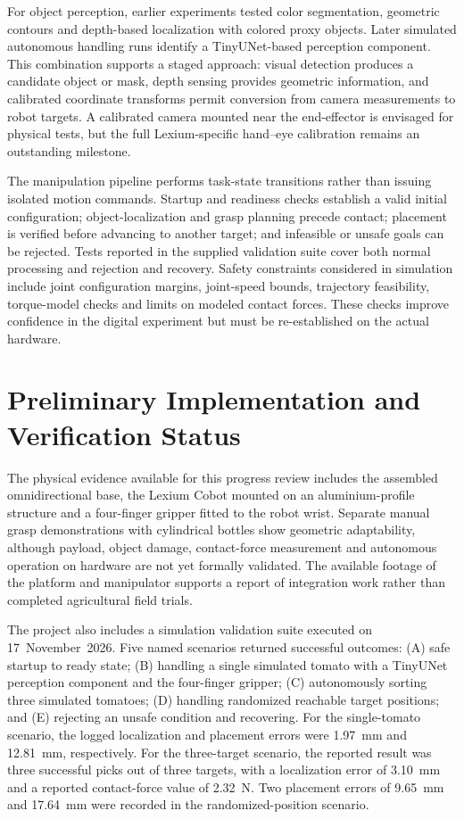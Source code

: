 For object perception, earlier experiments tested color segmentation, geometric
contours and depth-based localization with colored proxy objects. Later simulated
autonomous handling runs identify a TinyUNet-based perception component. This
combination supports a staged approach: visual detection produces a candidate object
or mask, depth sensing provides geometric information, and calibrated coordinate
transforms permit conversion from camera measurements to robot targets. A calibrated
camera mounted near the end-effector is envisaged for physical tests, but the full
Lexium-specific hand--eye calibration remains an outstanding milestone.

The manipulation pipeline performs task-state transitions rather than issuing isolated
motion commands. Startup and readiness checks establish a valid initial configuration;
object-localization and grasp planning precede contact; placement is verified before
advancing to another target; and infeasible or unsafe goals can be rejected. Tests
reported in the supplied validation suite cover both normal processing and rejection
and recovery. Safety constraints considered in simulation include joint configuration
margins, joint-speed bounds, trajectory feasibility, torque-model checks and limits on
modeled contact forces. These checks improve confidence in the digital experiment but
must be re-established on the actual hardware.

\section{Preliminary Implementation and Verification Status}
\label{sec:progress}

The physical evidence available for this progress review includes the assembled
omnidirectional base, the Lexium Cobot mounted on an aluminium-profile structure and
a four-finger gripper fitted to the robot wrist. Separate manual grasp demonstrations
with cylindrical bottles show geometric adaptability, although payload, object damage,
contact-force measurement and autonomous operation on hardware are not yet formally
validated. The available footage of the platform and manipulator supports a report
of integration work rather than completed agricultural field trials.

The project also includes a simulation validation suite executed on 17~November~2026.
Five named scenarios returned successful outcomes: (A) safe startup to ready state;
(B) handling a single simulated tomato with a TinyUNet perception component and the
four-finger gripper; (C) autonomously sorting three simulated tomatoes; (D) handling
randomized reachable target positions; and (E) rejecting an unsafe condition and
recovering. For the single-tomato scenario, the logged localization and placement
errors were 1.97~mm and 12.81~mm, respectively. For the three-target scenario, the
reported result was three successful picks out of three targets, with a localization
error of 3.10~mm and a reported contact-force value of 2.32~N. Two placement errors
of 9.65~mm and 17.64~mm were recorded in the randomized-position scenario.

